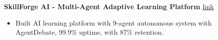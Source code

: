 
\textbf{SkillForge AI - Multi-Agent Adaptive Learning Platform} \hfill {\small \href{https://github.com/gurusaiss/auto-ai}{link}}
\begin{itemize}
    \item Built AI learning platform with 9-agent autonomous system with AgentDebate, 99.9\% uptime, with 87\% retention.
\end{itemize}


%     
%     
%     
%     

